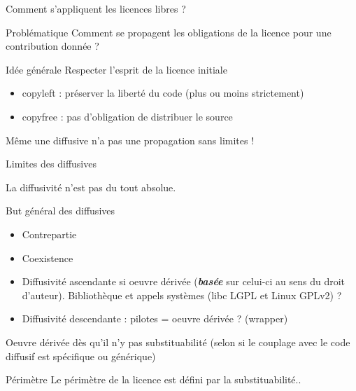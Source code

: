 \documentclass{beamer}
\begin{document}
\begin{frame}{Comment s'appliquent les licences libres ?}

  \begin{alertblock}{Problématique}
    Comment se propagent les obligations de la licence pour une contribution donnée ? 
  \end{alertblock}

  \begin{block}{Idée générale}
    Respecter l'esprit de la licence initiale    
  \end{block}

  \begin{itemize}
  \item copyleft : préserver la liberté du code (plus ou moins strictement)
  \item copyfree : pas d'obligation de distribuer le source
  \end{itemize}

Même une diffusive n'a pas une propagation sans limites !
  
\end{frame}


\begin{frame}{Limites des diffusives}

La diffusivité n'est pas du tout absolue.

  \begin{block}{But général des diffusives}
    \begin{itemize}
    \item Contrepartie
    \item Coexistence
    \end{itemize}
  \end{block}

  \begin{itemize}
  \item Diffusivité ascendante si oeuvre dérivée (\textbf{\textit{basée}} sur celui-ci au sens du droit d'auteur). Bibliothèque et appels systèmes (libc LGPL et Linux GPLv2) ? 
  \item Diffusivité descendante : pilotes = oeuvre dérivée ? (wrapper)
  \end{itemize}

Oeuvre dérivée dès qu'il n'y pas substituabilité (selon si le couplage avec le code diffusif est spécifique ou générique)

  \begin{alertblock}{Périmètre}
    Le périmètre de la licence est défini par la substituabilité..
  \end{alertblock}
\end{frame}
\end{document}

